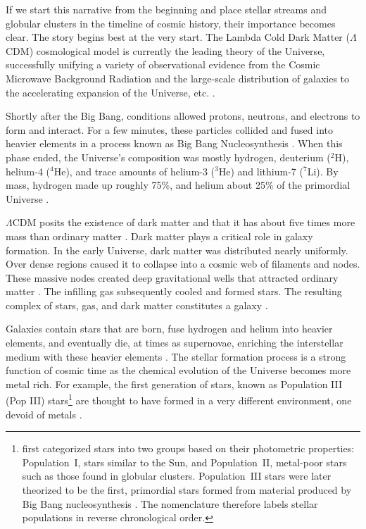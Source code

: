     If we start this narrative from the beginning and place stellar streams and globular clusters in the timeline of cosmic history, their importance becomes clear. The story begins best at the very start. The Lambda Cold Dark Matter ($\Lambda$CDM) cosmological model is currently the leading theory of the Universe, successfully unifying a variety of observational evidence from the Cosmic Microwave Background Radiation and the large-scale distribution of galaxies to the accelerating expansion of the Universe, etc. \citep{2001LRR.....4....1C,2022NewAR..9501659P}.

    Shortly after the Big Bang, conditions allowed protons, neutrons, and electrons to form and interact. For a few minutes, these particles collided and fused into heavier elements in a process known as Big Bang Nucleosynthesis \citep{2007ARNPS..57..463S}. When this phase ended, the Universe's composition was mostly hydrogen, deuterium ($^2$H), helium-4 ($^4$He), and trace amounts of helium-3 ($^3$He) and lithium-7 ($^7$Li). By mass, hydrogen made up roughly 75\%, and helium about 25\% of the primordial Universe \citep{1966ApJ...146..542P,2016RvMP...88a5004C}.

    $\Lambda$CDM posits the existence of dark matter and that it has about five times more mass than ordinary matter \citep{2020A&A...641A...6P}. Dark matter plays a critical role in galaxy formation. In the early Universe, dark matter was distributed nearly uniformly. Over dense regions caused it to collapse into a cosmic web of filaments and nodes. These massive nodes created deep gravitational wells that attracted ordinary matter \citep{1974ApJ...187..425P}. The infilling gas subsequently cooled and formed stars. The resulting complex of stars, gas, and dark matter constitutes a galaxy \citep{2008LNP...740.....P,2010gfe..book.....M}.

    Galaxies contain stars that are born, fuse hydrogen and helium into heavier elements, and eventually die, at times as supernovae,  enriching the interstellar medium with these heavier elements \parencite{2019A&ARv..27....3M}. The stellar formation process is a strong function of cosmic time as the chemical evolution of the Universe becomes more metal rich. For example, the first generation of stars, known as Population III (Pop III) stars\footnote{\citet{1944ApJ...100..137B} first categorized stars into two groups based on their photometric properties: Population~I, stars similar to the Sun, and Population~II, metal-poor stars such as those found in globular clusters. Population~III stars were later theorized to be the first, primordial stars formed from material produced by Big Bang nucleosynthesis \citep{1965gast.book..435B, 1981ApJ...248..606B, 2004ARA&A..42...79B}. The nomenclature therefore labels stellar populations in reverse chronological order.} are thought to have formed in a very different environment, one devoid of metals \citep{2002Sci...295...93A,2005SSRv..117..445G,2013RPPh...76k2901B}. 

